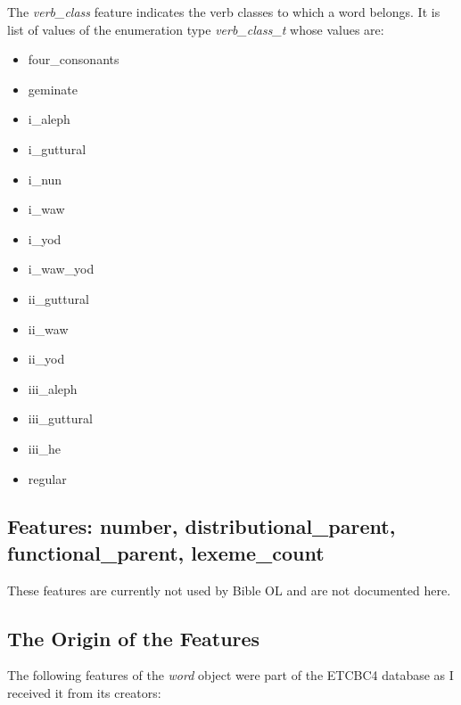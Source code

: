 \documentclass[11pt,oneside,a4paper]{memoir}
\begin{document}
The \emph{verb\_class} feature indicates the verb classes to which a word belongs. It is list of
values of the enumeration type \emph{verb\_class\_t} whose values are:

\begin{itemize}
\item four\_consonants
\item geminate
\item i\_aleph
\item i\_guttural
\item i\_nun
\item i\_waw
\item i\_yod
\item i\_waw\_yod
\item ii\_guttural
\item ii\_waw
\item ii\_yod
\item iii\_aleph
\item iii\_guttural
\item iii\_he
\item regular
\end{itemize}

\subsection{Features: number, distributional\_parent, functional\_parent, lexeme\_count}

These features are currently not used by Bible OL and are not documented here.

\subsection{The Origin of the Features}\label{etcbc-origin}

The following features of the \emph{word} object were part of the ETCBC4 database as I received it
from its creators:
\end{document}
